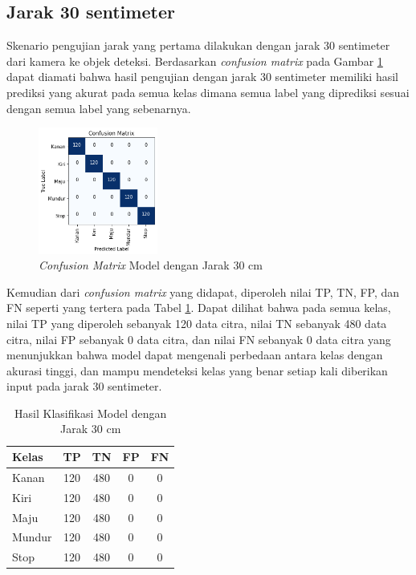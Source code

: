 \subsection{Jarak 30 sentimeter}

Skenario pengujian jarak yang pertama dilakukan dengan jarak 30 sentimeter dari kamera ke objek deteksi. Berdasarkan \emph{confusion matrix} pada Gambar \ref{fig:matrix2} dapat diamati bahwa hasil pengujian dengan jarak 30 sentimeter memiliki hasil prediksi yang akurat pada semua kelas dimana semua label yang diprediksi sesuai dengan semua label yang sebenarnya.

\begin{figure} [H] \centering
  \includegraphics[width=0.35\textwidth]{gambar/bab4/model5 (30cm)/matrix.png}
  \caption{\emph{Confusion Matrix} Model dengan Jarak 30 cm}
  \label{fig:matrix2}
\end{figure}

Kemudian dari \emph{confusion matrix} yang didapat, diperoleh nilai TP, TN, FP, dan FN seperti yang tertera pada Tabel \ref{tb:cm_model2}. Dapat dilihat bahwa pada semua kelas, nilai TP yang diperoleh sebanyak 120 data citra, nilai TN sebanyak 480 data citra, nilai FP sebanyak 0 data citra, dan nilai FN sebanyak 0 data citra yang menunjukkan bahwa model dapat mengenali perbedaan antara kelas dengan akurasi tinggi, dan mampu mendeteksi kelas yang benar setiap kali diberikan input pada jarak 30 sentimeter.

\begin{longtable}{|l|c|c|c|c|}
  \caption{Hasil Klasifikasi Model dengan Jarak 30 cm}
  \label{tb:cm_model2} \\
  \hline
  \rowcolor[HTML]{C0C0C0} 
  \textbf{Kelas} & \textbf{TP} & \textbf{TN} & \textbf{FP} & \textbf{FN} \\ \hline
  Kanan    & 120          & 480         & 0           & 0           \\ \hline
  Kiri      & 120          & 480         & 0           & 0           \\ \hline
  Maju      & 120          & 480         & 0           & 0           \\ \hline
  Mundur     & 120          & 480         & 0           & 0           \\ \hline
  Stop  & 120          & 480         & 0           & 0           \\ \hline
\end{longtable}

